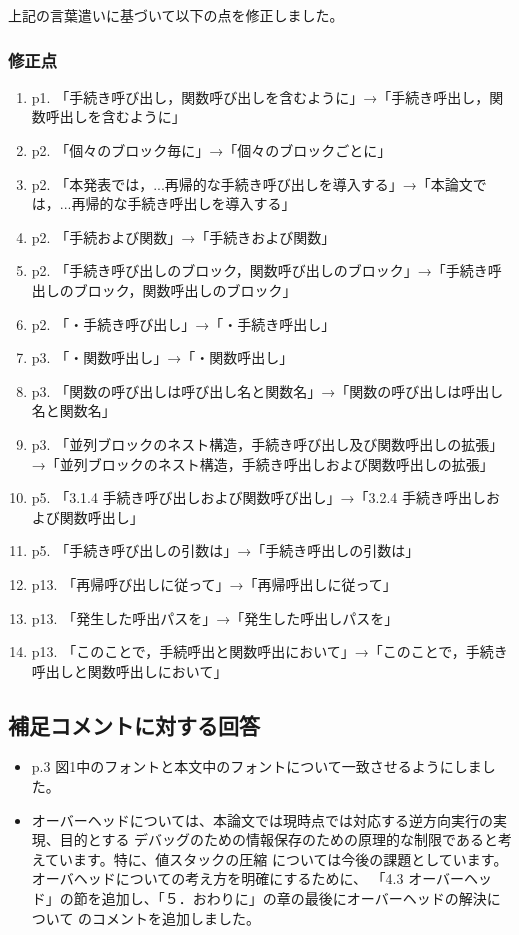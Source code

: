 \documentclass[a4j]{jarticle}
\begin{document}
上記の言葉遣いに基づいて以下の点を修正しました。
\subsubsection*{修正点}
\begin{enumerate}
\item p1. 「手続き呼び出し，関数呼び出しを含むように」→「手続き呼出し，関数呼出しを含むように」
\item p2. 「個々のブロック毎に」→「個々のブロックごとに」
\item p2. 「本発表では，...再帰的な手続き呼び出しを導入する」→「本論文では，...再帰的な手続き呼出しを導入する」
\item p2. 「手続および関数」→「手続きおよび関数」
\item p2. 「手続き呼び出しのブロック，関数呼び出しのブロック」→「手続き呼出しのブロック，関数呼出しのブロック」
\item p2. 「・手続き呼び出し」→「・手続き呼出し」
\item p3. 「・関数呼出し」→「・関数呼出し」
\item p3. 「関数の呼び出しは呼び出し名と関数名」→「関数の呼び出しは呼出し名と関数名」
\item p3. 「並列ブロックのネスト構造，手続き呼び出し及び関数呼出しの拡張」→「並列ブロックのネスト構造，手続き呼出しおよび関数呼出しの拡張」
\item p5. 「3.1.4  手続き呼び出しおよび関数呼び出し」→「3.2.4  手続き呼出しおよび関数呼出し」
\item p5. 「手続き呼び出しの引数は」→「手続き呼出しの引数は」
\item p13. 「再帰呼び出しに従って」→「再帰呼出しに従って」
\item p13. 「発生した呼出パスを」→「発生した呼出しパスを」
\item p13. 「このことで，手続呼出と関数呼出において」→「このことで，手続き呼出しと関数呼出しにおいて」
\end{enumerate}

\subsection*{補足コメントに対する回答}
\begin{itemize}
\item p.3 図1中のフォントと本文中のフォントについて一致させるようにしました。
\item オーバーヘッドについては、本論文では現時点では対応する逆方向実行の実現、目的とする
デバッグのための情報保存のための原理的な制限であると考えています。特に、値スタックの圧縮
については今後の課題としています。オーバヘッドについての考え方を明確にするために、
「4.3 オーバーヘッド」の節を追加し、「５．おわりに」の章の最後にオーバーヘッドの解決について
のコメントを追加しました。
\end{itemize}
\end{document}

